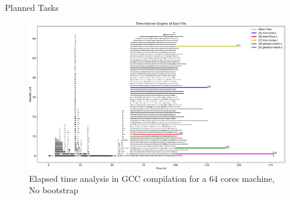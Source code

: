 \documentclass[12pt]{article}
\begin{document}
\begin{subsection}{Planned Tasks}
\begin{figure}[ht]
 \centering
 \includegraphics[scale=0.6, angle=-90]{out-crop.pdf}
 \caption{Elapsed time analysis in GCC compilation for a 64 cores machine, No bootstrap}
 \label{fig:analysis}
\end{figure}

\end{subsection}
\end{document}
